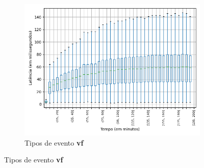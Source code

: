 \begin{figure}
\centering
\begin{subfigure}{.5\textwidth}
\centering
\includegraphics[width=\textwidth]{figuras/graphics/boxplot_10-dez-is_vf.png}
\caption{Tipos de evento \textbf{vf}}
\label{fig:BoxPlot_vf_10-dez-is}
\end{subfigure}%


\end{figure}
